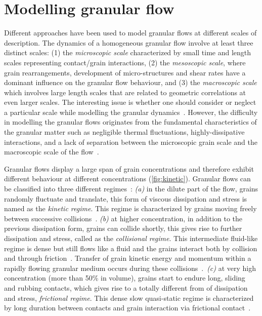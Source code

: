 \section{Modelling granular flow}

Different approaches have been used to model granular flows at different 
scales of description. The dynamics of a homogeneous granular flow involve at 
least three distinct scales: (1) the \textit{microscopic scale} characterized 
by small time and length scales representing contact/grain interactions, (2) 
the \textit{mesoscopic scale}, where grain rearrangements, development of 
micro-structures and shear rates have a dominant influence on the granular flow 
behaviour, and (3) the \textit{macroscopic scale} which involves large length 
scales that are related to geometric correlations at even larger scales. The 
interesting issue is whether one should consider or neglect a particular scale 
while modelling the granular dynamics~\citep{Radjai2009}. However, the 
difficulty in modelling the granular flows originates from the fundamental 
characteristics of the granular matter such as negligible thermal fluctuations, 
highly-dissipative interactions, and a lack of separation between the 
microscopic grain scale and the macroscopic scale of the 
flow~\citep{Goldhirsch2003}. 


Granular flows display a large span of grain concentrations and therefore 
exhibit different behaviour at different concentrations (\cref{fig:kinetic}). 
Granular flows can be classified into three different 
regimes~\citep{Jaeger1996}: \textit{(a)} in the dilute part of the flow, grains 
randomly fluctuate and translate, this form of viscous dissipation and stress 
is named as the \textit{kinetic regime}. This regime is characterized by grains 
moving freely between successive collisions~\citep{Goldhirsch2003}. 
\textit{(b)} at higher concentration, in addition to the previous dissipation 
form, grains can collide shortly, this gives rise to further dissipation and 
stress, called as the \textit{collisional regime}. This intermediate fluid-like 
regime is dense but still flows like a fluid and the grains interact both by 
collision and through friction~\citep{Midi2004,Pouliquen2002}. Transfer of 
grain kinetic energy and momentum within a rapidly flowing granular medium 
occurs during these collisions~\citep{Popken1999}.~\textit{(c)} at very high 
concentration (more than 50\% in volume), grains start to endure long, sliding 
and rubbing contacts, which gives rise to a totally different from of 
dissipation and stress, \textit{frictional regime}. This dense slow 
quasi-static regime is characterized by long duration between contacts and 
grain interaction via frictional contact~\citep{Roux2002}. 


